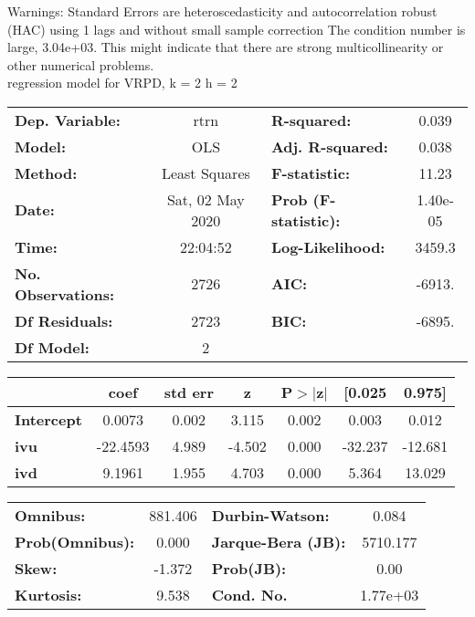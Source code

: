 Warnings: \newline
 [1] Standard Errors are heteroscedasticity and autocorrelation robust (HAC) using 1 lags and without small sample correction \newline
 [2] The condition number is large, 3.04e+03. This might indicate that there are \newline
 strong multicollinearity or other numerical problems.\\ 

regression model for VRPD, k = 2 h = 2\begin{center}
\begin{tabular}{lclc}
\toprule
\textbf{Dep. Variable:}    &       rtrn       & \textbf{  R-squared:         } &     0.039   \\
\textbf{Model:}            &       OLS        & \textbf{  Adj. R-squared:    } &     0.038   \\
\textbf{Method:}           &  Least Squares   & \textbf{  F-statistic:       } &     11.23   \\
\textbf{Date:}             & Sat, 02 May 2020 & \textbf{  Prob (F-statistic):} &  1.40e-05   \\
\textbf{Time:}             &     22:04:52     & \textbf{  Log-Likelihood:    } &    3459.3   \\
\textbf{No. Observations:} &        2726      & \textbf{  AIC:               } &    -6913.   \\
\textbf{Df Residuals:}     &        2723      & \textbf{  BIC:               } &    -6895.   \\
\textbf{Df Model:}         &           2      & \textbf{                     } &             \\
\bottomrule
\end{tabular}
\begin{tabular}{lcccccc}
                   & \textbf{coef} & \textbf{std err} & \textbf{z} & \textbf{P$> |$z$|$} & \textbf{[0.025} & \textbf{0.975]}  \\
\midrule
\textbf{Intercept} &       0.0073  &        0.002     &     3.115  &         0.002        &        0.003    &        0.012     \\
\textbf{ivu}       &     -22.4593  &        4.989     &    -4.502  &         0.000        &      -32.237    &      -12.681     \\
\textbf{ivd}       &       9.1961  &        1.955     &     4.703  &         0.000        &        5.364    &       13.029     \\
\bottomrule
\end{tabular}
\begin{tabular}{lclc}
\textbf{Omnibus:}       & 881.406 & \textbf{  Durbin-Watson:     } &    0.084  \\
\textbf{Prob(Omnibus):} &   0.000 & \textbf{  Jarque-Bera (JB):  } & 5710.177  \\
\textbf{Skew:}          &  -1.372 & \textbf{  Prob(JB):          } &     0.00  \\
\textbf{Kurtosis:}      &   9.538 & \textbf{  Cond. No.          } & 1.77e+03  \\
\bottomrule
\end{tabular}
\end{center}

